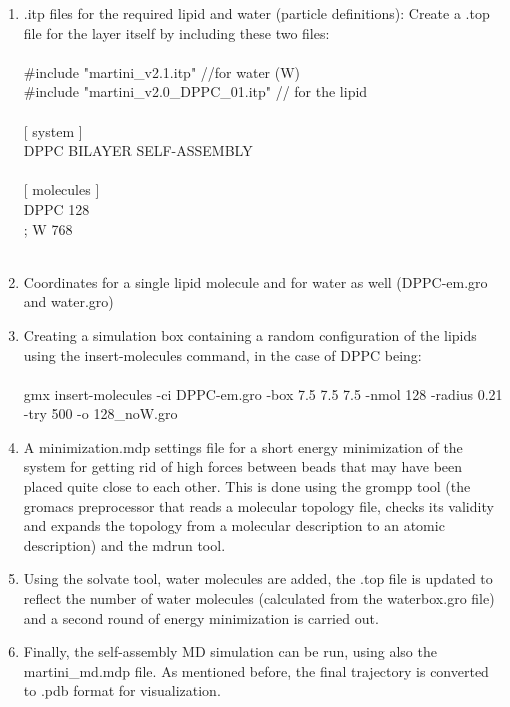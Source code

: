 \documentclass[12pt, a4paper]{report}
\begin{document}
\begin{enumerate}
    \item .itp files for the required lipid and water (particle definitions): Create a .top file for the layer itself by including these two files: 
    \\~\\
    \#include "martini\_v2.1.itp" //for water (W)
    \\
    \#include "martini\_v2.0\_DPPC\_01.itp" // for the lipid
    \\~\\
    {[ system ]}
    \\DPPC BILAYER SELF-ASSEMBLY
    \\~\\
    {[ molecules ]}
    \\DPPC 128
    \\; W 768 
    \\~\\ 
    
    \item Coordinates for a single lipid molecule and for water as well (DPPC-em.gro and water.gro) 
    \item Creating a simulation box containing a random configuration of the lipids using the insert-molecules command, in the case of DPPC being: 
    \\~\\ 
    gmx insert-molecules -ci DPPC-em.gro -box 7.5 7.5 7.5 -nmol 128 -radius 0.21 -try 500 -o 128\_noW.gro 
    \item 
    A minimization.mdp settings file for a short energy minimization of the system for getting rid of high forces between beads that may have been placed quite close to each other. This is done using the grompp tool (the gromacs preprocessor that reads a molecular topology file, checks its validity and expands the topology from a molecular description to an atomic description) and the mdrun tool. 
    \item Using the solvate tool, water molecules are added, the .top file is updated to reflect the number of water molecules (calculated from the waterbox.gro file) and a second round of energy minimization is carried out. 
    \item Finally, the self-assembly MD simulation can be run, using also the martini\_md.mdp file. As mentioned before, the final trajectory is converted to .pdb format for visualization. 
\end{enumerate} 
\end{document}
